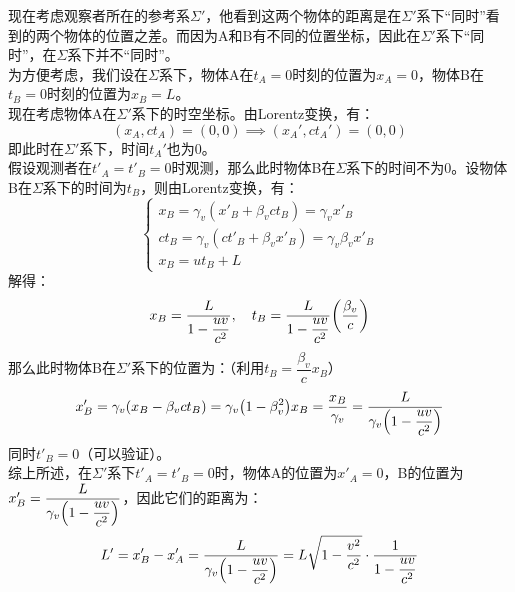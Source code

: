 \documentclass[a4paper]{article}
\begin{document}
\begin{enumerate}
{        现在考虑观察者所在的参考系$\Sigma'$，他看到这两个物体的距离是在$\Sigma'$系下“同时”看到的两个物体的位置之差。而因为A和B有不同的位置坐标，因此在$\Sigma'$系下“同时”，在$\Sigma$系下并不“同时”。 \\
        为方便考虑，我们设在$\Sigma$系下，物体A在$t_A = 0$时刻的位置为$x_A = 0$，物体B在$t_B = 0$时刻的位置为$x_B = L$。 \\
        现在考虑物体A在$\Sigma'$系下的时空坐标。由Lorentz变换，有：
        \[
            (x_A, ct_A) = (0, 0) \implies (x_A', ct_A') = (0, 0)
        \]
        即此时在$\Sigma'$系下，时间$t_A'$也为0。 \\
        假设观测者在$t'_A = t'_B = 0$时观测，那么此时物体B在$\Sigma$系下的时间不为0。设物体B在$\Sigma$系下的时间为$t_B$，则由Lorentz变换，有：
        \[
            \begin{cases}
                x_B = \gamma_v (x'_B + \beta_v ct_B) = \gamma_v x'_B \\
                ct_B = \gamma_v (ct'_B + \beta_v x'_B) = \gamma_v \beta_v x'_B \\
                x_B = ut_B + L
            \end{cases}
        \]
        解得：
        \[
            x_B = \frac{L}{1 - \dfrac{uv}{c^2}},\quad t_B = \frac{L}{1 - \dfrac{uv}{c^2}} \qty(\frac{\beta_v}{c})
        \]
        那么此时物体B在$\Sigma'$系下的位置为：（利用$t_B = \dfrac{\beta_v}{c} x_B$）
        \[
            x'_B = \gamma_v (x_B - \beta_v ct_B) = \gamma_v \qty(1 - \beta_v^2) x_B = \frac{x_B}{\gamma_v} = \frac{L}{\gamma_v \qty(1 - \dfrac{uv}{c^2})}
        \]
        同时$t'_B = 0$（可以验证）。 \\
        综上所述，在$\Sigma'$系下$t'_A = t'_B = 0$时，物体A的位置为$x'_A = 0$，B的位置为$x'_B = \dfrac{L}{\gamma_v \qty(1 - \dfrac{uv}{c^2})}$，因此它们的距离为：
        \[
            L' = x'_B - x'_A = \frac{L}{\gamma_v \qty(1 - \dfrac{uv}{c^2})} = L \sqrt{1 - \frac{v^2}{c^2}} \cdot \frac{1}{1 - \dfrac{uv}{c^2}}
        \]
    }
\end{enumerate}
\end{document}
